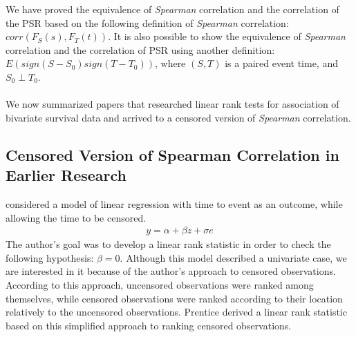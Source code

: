 \documentclass[]{article}
\begin{document}
We have proved the equivalence of \emph{Spearman} correlation and the correlation of the PSR based on the following definition of \emph{Spearman} correlation: $corr(F_S(s), F_T(t))$. It is also possible to show the equivalence of \emph{Spearman} correlation and the correlation of PSR using another definition: $E(sign(S-S_0)sign(T-T_0))$, where $(S,T)$ is a paired event time, and $S_0 \perp T_0$.\\
~\\
We now summarized papers that researched linear rank tests for association of bivariate survival data and arrived to a censored version of \emph{Spearman} correlation.


\subsection{Censored Version of Spearman Correlation in Earlier Research}

\cite{prentice1978linear}  considered a model of linear regression with time to event as an outcome, while allowing the time to be censored.
	$$
	\begin{aligned}
		y = \alpha + \beta z + \sigma e
	\end{aligned}
	$$
The author's goal was to develop a linear rank statistic in order to check the following hypothesis: $\beta = 0$. Although this model described a univariate case, we are interested in it because of the author's approach to censored observations.
According to this approach, uncensored observations were ranked among themselves, while censored observations were ranked according to their location relatively to the uncensored observations. Prentice derived a linear rank statistic based on this simplified approach to ranking censored observations.\\
\end{document}
